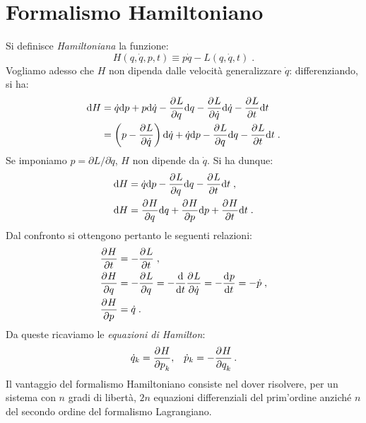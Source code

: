 \section{Formalismo Hamiltoniano}
Si definisce \textit{Hamiltoniana} la funzione:
\begin{equation}
H(q,\dot{q},p,t)\equiv p\dot{q}-L(q,\dot{q},t)\;.
\end{equation}
Vogliamo adesso che $H$ non dipenda dalle velocità generalizzare $\dot{q}$: differenziando, si ha:
\begin{align}
\mathrm{d}{H} &= \dot{q}\mathrm{d}{p}+p\mathrm{d}{\dot{q}}-\frac{\partial^{}L}{\partial q^{}}\mathrm{d}{q}-\frac{\partial^{}L}{\partial \dot{q}^{}}\mathrm{d}{\dot{q}}-\frac{\partial^{}L}{\partial t^{}}\mathrm{d}{t} \notag \\
&=\left(p-\frac{\partial^{}L}{\partial \dot{q}^{}}\right)\mathrm{d}{\dot{q}}+\dot{q}\mathrm{d}{p}-\frac{\partial^{}L}{\partial q^{}}\mathrm{d}{q}-\frac{\partial^{}L}{\partial t^{}}\mathrm{d}{t}\;.
\end{align}
Se imponiamo $p=\partial L/\partial\dot{q}$, $H$ non dipende da $\dot{q}$. Si ha dunque:
\begin{align}
\mathrm{d}{H} &= \dot{q}\mathrm{d}{p}-\frac{\partial^{}L}{\partial q^{}}\mathrm{d}{q}-\frac{\partial^{}L}{\partial t^{}}\mathrm{d}{t}\;, \\
\mathrm{d}{H} &= \frac{\partial^{}H}{\partial q^{}}\mathrm{d}{q}+\frac{\partial^{}H}{\partial p^{}}\mathrm{d}{p}+\frac{\partial^{}H}{\partial t^{}}\mathrm{d}{t}\;.
\end{align}
Dal confronto si ottengono pertanto le seguenti relazioni:
\begin{align}
\frac{\partial^{}H}{\partial t^{}} &=-\frac{\partial^{}L}{\partial t^{}}\;, \\
\frac{\partial^{}H}{\partial q^{}} &=-\frac{\partial^{}L}{\partial q^{}}=-\frac{\mathrm{d}}{\mathrm{d}{t}}\frac{\partial^{}L}{\partial \dot{q}^{}}=-\frac{\mathrm{d}^{}p}{\mathrm{d}t^{}}=-\dot{p}\;, \\
\frac{\partial^{}H}{\partial p^{}} &= \dot{q}\;.
\end{align}
Da queste ricaviamo le \textit{equazioni di Hamilton}:
\begin{align}
&\dot{q}_k=\frac{\partial^{}H}{\partial p_k^{}}, &\dot{p}_k=-\frac{\partial^{}H}{\partial q_k^{}}\,.
\end{align}
Il vantaggio del formalismo Hamiltoniano consiste nel dover risolvere, per un sistema con $n$ gradi di libertà, $2n$ equazioni differenziali del prim'ordine anziché $n$ del secondo ordine del formalismo Lagrangiano.
